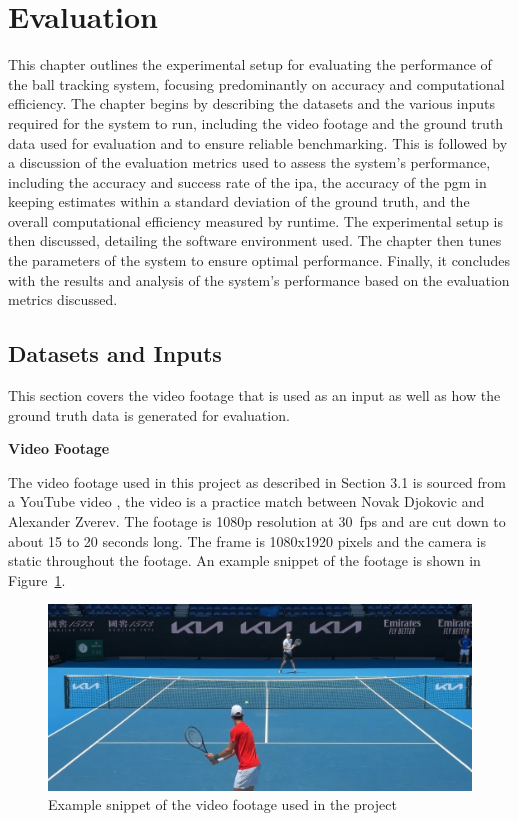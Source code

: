 \documentclass[12pt,a4paper]{article}
\begin{document}
\section{Evaluation}
This chapter outlines the experimental setup for evaluating the performance of the ball tracking system, focusing predominantly on accuracy and computational efficiency. The chapter begins by describing the datasets and the various inputs required for the system to run, including the video footage and the ground truth data used for evaluation and to ensure reliable benchmarking. This is followed by a discussion of the evaluation metrics used to assess the system's performance, including the accuracy and success rate of the \acs{ipa}, the accuracy of the \acs{pgm} in keeping estimates within a standard deviation of the ground truth, and the overall computational efficiency measured by runtime. The experimental setup is then discussed, detailing the software environment used. The chapter then tunes the parameters of the system to ensure optimal performance. Finally, it concludes with the results and analysis of the system's performance based on the evaluation metrics discussed.

\subsection{Datasets and Inputs}
This section covers the video footage that is used as an input as well as how the ground truth data is generated for evaluation.

\textbf{Video Footage}

The video footage used in this project as described in Section 3.1 is sourced from a YouTube video \parencite{youtube_ZverevDjokovic}, the video is a practice match between Novak Djokovic and Alexander Zverev. The footage is 1080p resolution at 30~\acs{fps} and are cut down to about 15 to 20 seconds long. The frame is 1080x1920 pixels and the camera is static throughout the footage. An example snippet of the footage is shown in Figure~\ref{fig:footage}.

\begin{figure}[H]
	\centering
	\includegraphics[width=1\textwidth]{ZvDIn.jpg}
	\caption{Example snippet of the video footage used in the project}
	\label{fig:footage}
\end{figure}
\end{document}
